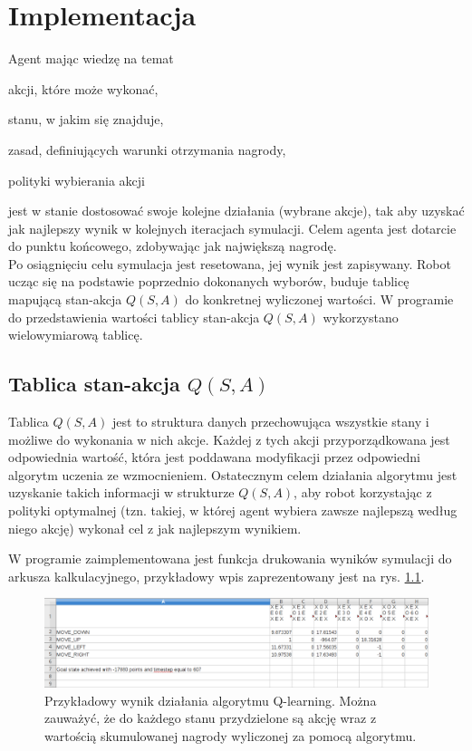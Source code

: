\chapter{Implementacja}
\label{cha:implementacja}

Agent mając wiedzę na temat
\begin{itemize*}
\renewcommand{\labelitemi}{$\bullet$}
 \item akcji, które może wykonać,
 \item stanu, w jakim się znajduje,
 \item zasad, definiujących warunki otrzymania nagrody,
 \item polityki wybierania akcji
\end{itemize*}
jest w stanie dostosować swoje kolejne działania (wybrane akcje), tak aby uzyskać jak
najlepszy wynik w kolejnych iteracjach symulacji. Celem agenta jest dotarcie do punktu końcowego, zdobywając jak 
największą nagrodę. \\
\indent Po osiągnięciu celu symulacja jest resetowana, jej wynik jest zapisywany. Robot ucząc się na podstawie 
poprzednio dokonanych wyborów, buduje tablicę mapującą stan-akcja $Q(S, A)$ do konkretnej wyliczonej wartości. W 
programie do przedstawienia wartości tablicy stan-akcja $Q(S, A)$ wykorzystano wielowymiarową tablicę.

\section{Tablica stan-akcja $Q(S, A)$}

Tablica $Q(S, A)$ jest to struktura danych przechowująca wszystkie stany i możliwe do wykonania w nich akcje. Każdej z tych akcji przyporządkowana jest odpowiednia wartość, która jest poddawana modyfikacji przez odpowiedni algorytm uczenia ze wzmocnieniem.
Ostatecznym celem działania algorytmu jest uzyskanie takich informacji w strukturze $Q(S, A)$, aby robot korzystając z polityki optymalnej (tzn. takiej, w której agent wybiera zawsze najlepszą według niego akcję) wykonał cel z jak najlepszym wynikiem.

W programie zaimplementowana jest funkcja drukowania wyników symulacji do arkusza kalkulacyjnego, przykładowy wpis 
zaprezentowany jest na rys. \ref{fig:przykladowywpis}.


\begin{figure}[H]
    \centering
    \includegraphics[scale=0.4]{przykladowywpis}
    \caption{Przykładowy wynik działania algorytmu Q-learning. Można zauważyć, że do każdego stanu przydzielone są 
akcję wraz z wartością skumulowanej nagrody wyliczonej za pomocą algorytmu.}
    \label{fig:przykladowywpis}
\end{figure}

